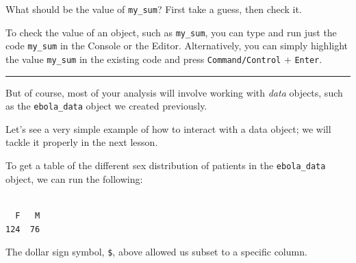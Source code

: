 \documentclass[
  letterpaper,
  DIV=11,
  numbers=noendperiod]{scrreprt}
\newenvironment{Shaded}{\begin{snugshade}}{\end{snugshade}}
\newcommand{\FunctionTok}[1]{\textcolor[rgb]{0.28,0.35,0.67}{#1}}
\newcommand{\NormalTok}[1]{\textcolor[rgb]{0.00,0.23,0.31}{#1}}
\newcommand{\SpecialCharTok}[1]{\textcolor[rgb]{0.37,0.37,0.37}{#1}}
\begin{document}
What should be the value of \texttt{my\_sum}? First take a guess, then
check it.

\begin{tcolorbox}[enhanced jigsaw, titlerule=0mm, colback=white, left=2mm, breakable, opacitybacktitle=0.6, colbacktitle=quarto-callout-note-color!10!white, colframe=quarto-callout-note-color-frame, bottomtitle=1mm, opacityback=0, coltitle=black, arc=.35mm, toptitle=1mm, title=\textcolor{quarto-callout-note-color}{\faInfo}\hspace{0.5em}{Side Note}, leftrule=.75mm, toprule=.15mm, bottomrule=.15mm, rightrule=.15mm]

To check the value of an object, such as \texttt{my\_sum}, you can type
and run just the code \texttt{my\_sum} in the Console or the Editor.
Alternatively, you can simply highlight the value \texttt{my\_sum} in
the existing code and press \texttt{Command/Control} + \texttt{Enter}.

\end{tcolorbox}

\begin{center}\rule{0.5\linewidth}{0.5pt}\end{center}

But of course, most of your analysis will involve working with
\emph{data} objects, such as the \texttt{ebola\_data} object we created
previously.

Let's see a very simple example of how to interact with a data object;
we will tackle it properly in the next lesson.

To get a table of the different sex distribution of patients in the
\texttt{ebola\_data} object, we can run the following:

\begin{Shaded}
\end{Shaded}

\begin{verbatim}

  F   M 
124  76 
\end{verbatim}

The dollar sign symbol, \texttt{\$}, above allowed us subset to a
specific column.
\end{document}
